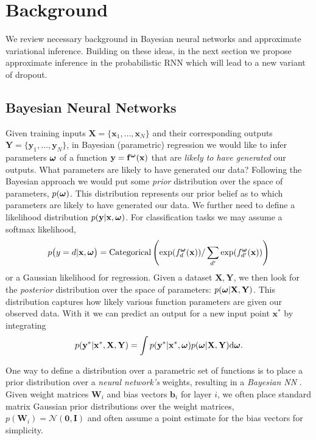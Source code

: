 \documentclass{article}
\newcommand{\N}{\mathcal{N}}
\newcommand{\td}{\text{d}}
\newcommand{\f}{\mathbf{f}}
\newcommand{\x}{\mathbf{x}}
\newcommand{\Bb}{\mathbf{b}}
\newcommand{\y}{\mathbf{y}}
\newcommand{\W}{\mathbf{W}}
\newcommand{\X}{\mathbf{X}}
\newcommand{\Y}{\mathbf{Y}}
\newcommand{\I}{\mathbf{I}}
\newcommand{\bz}{\mathbf{0}}
\newcommand{\bo}{\text{\boldmath$\omega$}}
\theoremstyle{definition}
\begin{document}
\section{Background}

We review necessary background in Bayesian neural networks and approximate variational inference. Building on these ideas, in the next section we propose approximate inference in the probabilistic RNN which will lead to a new variant of dropout.


\newcommand{\h}{\mathbf{h}}


\newcommand{\U}{\mathbf{U}}


\subsection{Bayesian Neural Networks}\label{sec:BNN}

Given training inputs $\X = \{ \x_1, \hdots, \x_N \}$ and their corresponding outputs $\Y = \{\y_1, \hdots, \y_N\}$, in Bayesian (parametric) regression we would like to infer parameters $\bo$ of a function $\y = \f^\bo(\mathbf{x})$ that are \textit{likely to have generated} our outputs. 
What parameters are likely to have generated our data? Following the Bayesian approach we would put some \textit{prior} distribution over the space of parameters, $p(\bo)$. This distribution represents our prior belief as to which parameters are likely to have generated our data.
We further need to define a likelihood distribution $p(\y | \x, \bo)$.
For classification tasks we may assume a softmax likelihood, \begin{align*}
p \big( y=d | \x, \bo \big) = \text{Categorical}\left( \exp( f_d^\bo(\x) ) / \sum_{d'} \exp( f^\bo_{d'}(\x)) \right)
\end{align*}
or a Gaussian likelihood for regression. Given a dataset $\X, \Y$, we then look for the \textit{posterior} distribution over the space of parameters: $p(\bo | \X, \Y)$.
This distribution captures how likely various function parameters are given our observed data.
With it we can predict an output for a new input point $\x^*$ by integrating
\begin{align} \label{eq:post}
p(\y^* | \x^*, \X, \Y) = \int p(\y^* | \x^*, \bo) p(\bo | \X, \Y) \td \bo.
\end{align}

One way to define a distribution over a parametric set of functions is to place a prior distribution over a \textit{neural network's} weights, resulting in a \textit{Bayesian NN} \citep{mackay1992practical,neal1995bayesian}.
Given weight matrices $\W_i$ and bias vectors $\Bb_i$ for layer $i$, we often place standard matrix Gaussian prior distributions over the weight matrices, $p(\W_i) = \N(\bz, \I)$
and often assume a point estimate for the bias vectors for simplicity.
\end{document}
